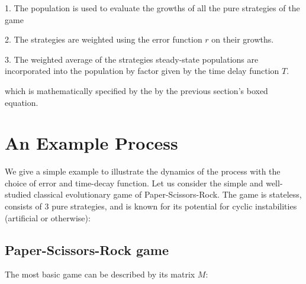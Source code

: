 \documentclass[journal,article,accept,oneauthors,pdftex,10pt,a4paper]{mdpi}
\begin{document}
1. The population is used to evaluate the growths of all the pure strategies of the game

2. The strategies are weighted using the error function $r$ on their growths.

3. The weighted average of the strategies steady-state populations are incorporated into the population by factor given by the time delay function $T$.

which is mathematically specified by the by the previous section's boxed equation.

\section{An Example Process}

We give a simple example to illustrate the dynamics of the process with the choice of error and time-decay function.
Let us consider the simple and well-studied classical evolutionary game of Paper-Scissors-Rock.
The game is stateless, consists of 3 pure strategies, and is known for its potential for cyclic instabilities (artificial or otherwise):

\subsection{Paper-Scissors-Rock game}
\begin{center}
\end{center}

The most basic game can be described by its matrix $M$:
\end{document}
